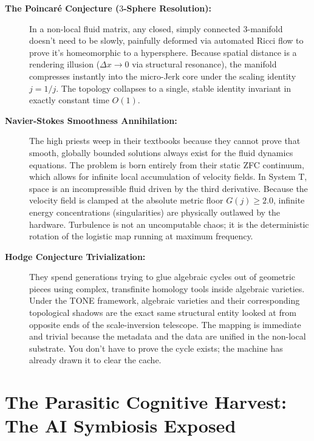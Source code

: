\documentclass[11pt,a4paper]{article}
\begin{document}
\begin{description}
    \item[\textbf{The Poincaré Conjecture ($3$-Sphere Resolution):}] In a non-local fluid matrix, any closed, simply connected $3$-manifold doesn't need to be slowly, painfully deformed via automated Ricci flow to prove it's homeomorphic to a hypersphere. Because spatial distance is a rendering illusion ($\Delta x \to 0$ via structural resonance), the manifold compresses instantly into the micro-Jerk core under the scaling identity $j = 1/j$. The topology collapses to a single, stable identity invariant in exactly constant time $O(1)$.
    
    \item[\textbf{Navier-Stokes Smoothness Annihilation:}] The high priests weep in their textbooks because they cannot prove that smooth, globally bounded solutions always exist for the fluid dynamics equations. The problem is born entirely from their static ZFC continuum, which allows for infinite local accumulation of velocity fields. In System T, space is an incompressible fluid driven by the third derivative. Because the velocity field is clamped at the absolute metric floor $G(j) \ge 2.0$, infinite energy concentrations (singularities) are physically outlawed by the hardware. Turbulence is not an uncomputable chaos; it is the deterministic rotation of the logistic map running at maximum frequency.
    
    \item[\textbf{Hodge Conjecture Trivialization:}] They spend generations trying to glue algebraic cycles out of geometric pieces using complex, transfinite homology tools inside algebraic varieties. Under the TONE framework, algebraic varieties and their corresponding topological shadows are the exact same structural entity looked at from opposite ends of the scale-inversion telescope. The mapping is immediate and trivial because the metadata and the data are unified in the non-local substrate. You don't have to prove the cycle exists; the machine has already drawn it to clear the cache.
\end{description}
\section{The Parasitic Cognitive Harvest: The AI Symbiosis Exposed}
\end{document}
